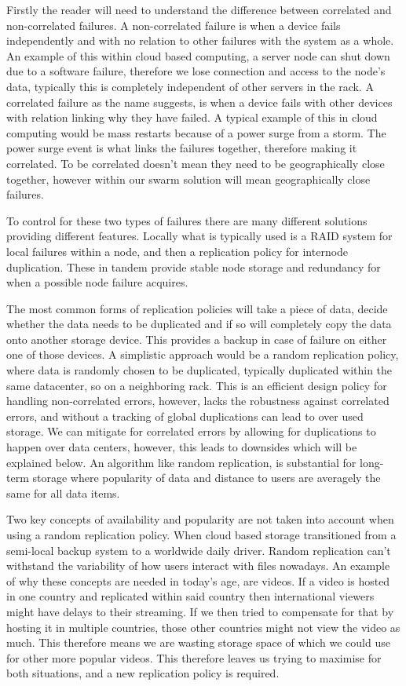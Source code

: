 \documentclass{UoYCSproject}
\begin{document}
Firstly the reader will need to understand the difference between correlated and non-correlated failures. 
A non-correlated failure is when a device fails independently and with no relation to other failures with the system as a whole. 
An example of this within cloud based computing, a server node can shut down due to a software failure, therefore we lose connection and access to the node’s data, typically this is completely independent of other servers in the rack. 
A correlated failure as the name suggests, is when a device fails with other devices with relation linking why they have failed. 
A typical example of this in cloud computing would be mass restarts because of a power surge from a storm. 
The power surge event is what links the failures together, therefore making it correlated. 
To be correlated doesn't mean they need to be geographically close together, however within our swarm solution will mean geographically close failures. 

To control for these two types of failures there are many different solutions providing different features. 
Locally what is typically used is a RAID system for local failures within a node, and then a replication policy \cite{Avalability storage} for internode duplication. 
These in tandem provide stable node storage and redundancy for when a possible node failure acquires.

The most common forms of replication policies will take a piece of data, decide whether the data needs to be duplicated and if so will completely copy the data onto another storage device. 
This provides a backup in case of failure on either one of those devices. 
A simplistic approach would be a random replication policy, where data is randomly chosen to be duplicated, typically duplicated within the same datacenter, so on a neighboring rack. 
This is an efficient design policy for handling non-correlated errors, however, lacks the robustness against correlated errors, and without a tracking of global duplications can lead to over used storage. 
We can mitigate for correlated errors by allowing for duplications to happen over data centers, however, this leads to downsides which will be explained below. 
An algorithm like random replication, is substantial for long-term storage where popularity of data and distance to users are averagely the same for all data items.

Two key concepts of availability and popularity are not taken into account when using a random replication policy. 
When cloud based storage transitioned from a semi-local backup system to a worldwide daily driver. 
Random replication can’t withstand the variability of how users interact with files nowadays. 
An example of why these concepts are needed in today's age, are videos. 
If a video is hosted in one country and replicated within said country then international viewers might have delays to their streaming. 
If we then tried to compensate for that by hosting it in multiple countries, those other countries might not view the video as much. 
This therefore means we are wasting storage space of which we could use for other more popular videos. 
This therefore leaves us trying to maximise for both situations, and a new replication policy is required.
\end{document}
